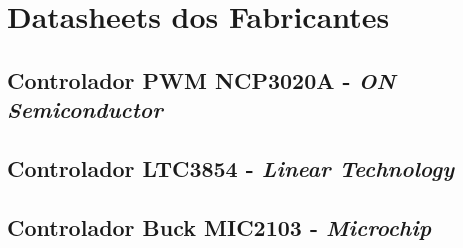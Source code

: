 \chapter{Datasheets dos Fabricantes}
\section{Controlador PWM NCP3020A - \textit{\textbf{ON Semiconductor}}}
%
\section{Controlador LTC3854 - \textit{\textbf{Linear Technology}}}
%
\section{Controlador Buck MIC2103 - \textit{\textbf{Microchip}}}
%
